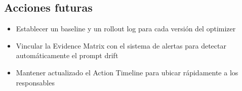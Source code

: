 \documentclass[a4paper]{article}
\begin{document}
\subsection{Acciones futuras}

\begin{itemize}
    \item Establecer un baseline y un rollout log para cada versión del optimizer
    \item Vincular la Evidence Matrix con el sistema de alertas para detectar automáticamente el prompt drift
    \item Mantener actualizado el Action Timeline para ubicar rápidamente a los responsables
\end{itemize}
\end{document}
